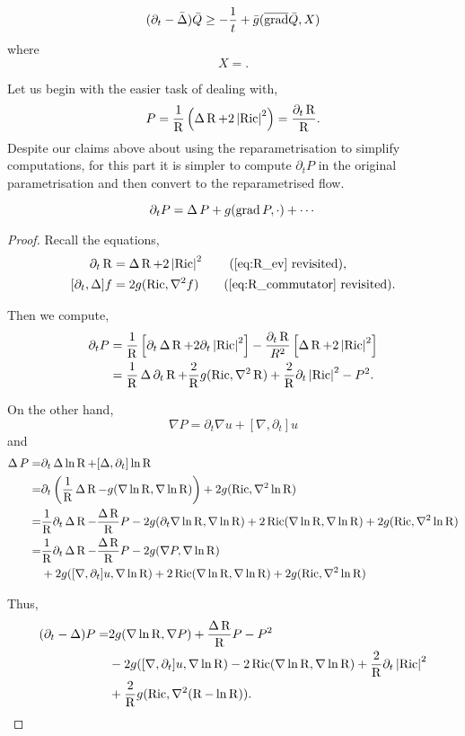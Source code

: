 \documentclass{amsart}
\begin{document}
\begin{prop}
\label{prop:Q_maxprinciple}
\[
(\partial_t - \bar{\Delta}) \bar{Q} \geq - \frac{1}{t} + \bar{g}(\overline{\operatorname{grad}} \bar{Q}, X)
\]
where
\[
X = .
\]
\end{prop}

Let us begin with the easier task of dealing with,
\[
P = \frac{1}{\operatorname{R}} \left(\operatorname{\Delta} \operatorname{R} + 2\left|{\operatorname{Ric}}\right|^2\right) = \frac{\partial_t \operatorname{R}}{\operatorname{R}}.
\]
Despite our claims above about using the reparametrisation to simplify computations, for this part it is simpler to compute \(\partial_t P\) in the original parametrisation and then convert to the reparametrised flow.

\begin{lemma}
\label{lem:dtP}
\[
\partial_t P = \operatorname{\Delta} P + g(\operatorname{grad} P, \cdot) + \cdots
\]
\end{lemma}

\begin{proof}
Recall the equations,
\begin{align*}
\partial_t \R &= \laplace \R + 2 \abs{\ric}^2 \tag{\ref{eq:R_ev} revisited}, \\
[\partial_t, \laplace] f &= 2 g(\ric, \nabla^2 f) \tag{\ref{eq:R_commutator} revisited}.
\end{align*}

Then we compute,
\[
\begin{split}
\partial_t P &= \frac{1}{\operatorname{R}} \left[\partial_t \operatorname{\Delta} \operatorname{R} + 2 \partial_t \left|{\operatorname{Ric}}\right|^2\right] - \frac{\partial_t \operatorname{R}}{R^2} \left[\operatorname{\Delta} \operatorname{R} + 2 \left|{\operatorname{Ric}}\right|^2\right] \\
&= \frac{1}{\operatorname{R}} \operatorname{\Delta} \partial_t \operatorname{R} + \frac{2}{\operatorname{R}} g(\operatorname{Ric}, \nabla^2 \operatorname{R}) + \frac{2}{\operatorname{R}} \partial_t \left|{\operatorname{Ric}}\right|^2 - P^2.
\end{split}
\]

On the other hand,
\[
\nabla P = \partial_t \nabla u + [\nabla, \partial_t] u
\]
and
\[
\begin{split}
\operatorname{\Delta} P =& \partial_t \operatorname{\Delta} \ln \operatorname{R} + [\operatorname{\Delta}, \partial_t] \ln \operatorname{R} \\
=& \partial_t \left(\frac{1}{\operatorname{R}} \operatorname{\Delta} \operatorname{R} - g(\nabla \ln \operatorname{R}, \nabla \ln \operatorname{R})\right) + 2g(\operatorname{Ric}, \nabla^2 \ln \operatorname{R}) \\
=& \frac{1}{\operatorname{R}} \partial_t \operatorname{\Delta} \operatorname{R} - \frac{\operatorname{\Delta} \operatorname{R}}{\operatorname{R}} P - 2 g(\partial_t \nabla \ln \operatorname{R}, \nabla \ln \operatorname{R}) + 2\operatorname{Ric}(\nabla \ln \operatorname{R}, \nabla \ln \operatorname{R}) + 2g(\operatorname{Ric}, \nabla^2 \ln \operatorname{R}) \\
=& \frac{1}{\operatorname{R}} \partial_t \operatorname{\Delta} \operatorname{R} - \frac{\operatorname{\Delta} \operatorname{R}}{\operatorname{R}} P - 2 g(\nabla P, \nabla \ln \operatorname{R}) \\
& + 2 g([\nabla, \partial_t] u, \nabla \ln \operatorname{R}) + 2\operatorname{Ric}(\nabla \ln \operatorname{R}, \nabla \ln \operatorname{R}) + 2g(\operatorname{Ric}, \nabla^2 \ln \operatorname{R}) 
\end{split}
\]

Thus,
\[
\begin{split}
(\partial_t - \operatorname{\Delta}) P =& 2 g(\nabla \ln \operatorname{R}, \nabla P) + \frac{\operatorname{\Delta} \operatorname{R}}{\operatorname{R}} P - P^2 \\
& - 2 g([\nabla, \partial_t] u, \nabla \ln \operatorname{R}) - 2\operatorname{Ric}(\nabla \ln \operatorname{R}, \nabla \ln \operatorname{R}) + \frac{2}{\operatorname{R}} \partial_t \left|{\operatorname{Ric}}\right|^2 \\
& + \frac{2}{\operatorname{R}} g(\operatorname{Ric}, \nabla^2 (\operatorname{R} - \ln \operatorname{R})).
\end{split}
\]
\end{proof}
\end{document}
